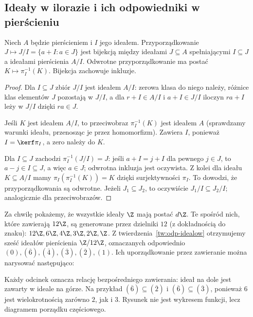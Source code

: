 \subsection{Ideały w ilorazie i ich odpowiedniki w pierścieniu}

\begin{twierdzenie}
\label{tw:odp-idealow}
Niech $A$ będzie pierścieniem i $I$ jego ideałem.
Przyporządkowanie $J\mapsto J/I=\{a+I:a\in J\}$ jest bijekcją
między ideałami $J\subseteq A$ spełniającymi $I\subseteq J$
a ideałami pierścienia $A/I$. Odwrotne przyporządkowanie ma postać
$K\mapsto\pi_I^{-1}(K)$. Bijekcja zachowuje inkluzje.
\end{twierdzenie}
\begin{proof}
Dla $I\subseteq J$ zbiór $J/I$ jest ideałem $A/I$:
zerowa klasa do niego należy, różnice klas elementów $J$ pozostają
w $J/I$, a dla $r+I\in A/I$ i $a+I\in J/I$ iloczyn
$ra+I$ leży w $J/I$ dzięki $ra\in J$.

Jeśli $K$ jest ideałem $A/I$, to przeciwobraz $\pi_I^{-1}(K)$ jest
ideałem $A$ (sprawdzamy warunki ideału, przenosząc je przez homomorfizm).
Zawiera $I$, ponieważ $I=\kerf\pi_I$, a zero należy do $K$.

Dla $I\subseteq J$ zachodzi
$\pi_I^{-1}(J/I)=J$: jeśli $a+I=j+I$ dla pewnego $j\in J$,
to $a-j\in I\subseteq J$, a więc $a\in J$; odwrotna inkluzja
jest oczywista. Z kolei dla ideału $K\subseteq A/I$ mamy
$\pi_I(\pi_I^{-1}(K))=K$ dzięki surjektywności $\pi_I$.
To dowodzi, że przyporządkowania są odwrotne.
Jeżeli $J_1\subseteq J_2$, to oczywiście $J_1/I\subseteq J_2/I$;
analogicznie dla przeciwobrazów.
\end{proof}

\begin{przyklad}
Za chwilę pokażemy, że wszystkie ideały $\Z$ mają postać $d\Z$.
Te spośród nich, które zawierają $12\Z$, są generowane przez
dzielniki $12$ (z dokładnością do znaku):
$12\Z,6\Z,4\Z,3\Z,2\Z,\Z$.
Z twierdzenia~\ref{tw:odp-idealow} otrzymujemy sześć ideałów
pierścienia $\Z/12\Z$, oznaczanych odpowiednio
$(0),(\overline6),(\overline4),(\overline3),(\overline2),(1)$.
Ich uporządkowanie przez zawieranie można narysować następująco:
\end{przyklad}

\begin{center}
\end{center}
Każdy odcinek oznacza relację bezpośredniego zawierania:
ideał na dole jest zawarty w ideale na górze. Na przykład
$(\overline6)\subseteq(\overline2)$ i
$(\overline6)\subseteq(\overline3)$, ponieważ $6$ jest wielokrotnością
zarówno $2$, jak i $3$. Rysunek nie jest wykresem funkcji,
lecz diagramem porządku częściowego.


